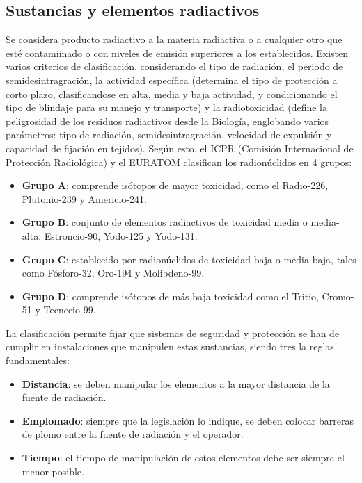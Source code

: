 \subsection{Sustancias y elementos radiactivos}
Se considera producto radiactivo a la materia radiactiva o a cualquier otro que esté contamiinado o con niveles de emisión superiores a los establecidos. Existen varios criterios de clasificación, considerando el tipo de radiación, el periodo de semidesintragración, la actividad específica (determina el tipo de protección a corto plazo, clasificandose en alta, media y baja actividad, y condicionando el tipo de blindaje para su manejo y transporte) y la radiotoxicidad (define la peligrosidad de los residuos radiactivos desde la Biología, englobando varios parámetros: tipo de radiación, semidesintragración, velocidad de expulsión y capacidad de fijación en tejidos). Según esto, el ICPR (Comisión Internacional de Protección Radiológica) y el EURATOM clasifican los radionúclidos en 4 grupos:
    \begin{itemize}[itemsep=0pt,parsep=0pt,topsep=0pt,partopsep=0pt]
        \item \textbf{Grupo A}: comprende isótopos de mayor toxicidad, como el Radio-226, Plutonio-239 y Americio-241.
        \item \textbf{Grupo B}: conjunto de elementos radiactivos de toxicidad media o media-alta: Estroncio-90, Yodo-125 y Yodo-131.
        \item \textbf{Grupo C}: establecido por radionúclidos de toxicidad baja o media-baja, tales como Fósforo-32, Oro-194 y Molibdeno-99.
        \item \textbf{Grupo D}: comprende isótopos de más baja toxicidad como el Tritio, Cromo-51 y Tecnecio-99.
    \end{itemize}

La clasificación permite fijar que sistemas de seguridad y protección se han de cumplir en instalaciones que manipulen estas sustancias, siendo tres la reglas fundamentales:
    \begin{itemize}[itemsep=0pt,parsep=0pt,topsep=0pt,partopsep=0pt]
        \item \textbf{Distancia}: se deben manipular los elementos a la mayor distancia de la fuente de radiación.
        \item \textbf{Emplomado}: siempre que la legislación lo indique, se deben colocar barreras de plomo entre la fuente de radiación y el operador.
        \item \textbf{Tiempo}: el tiempo de manipulación de estos elementos debe ser siempre el menor posible.
    \end{itemize}
